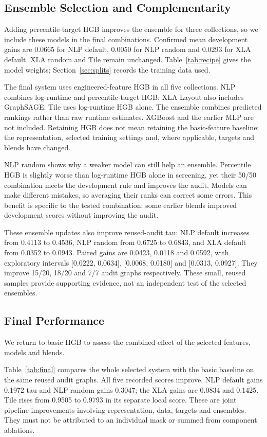 \documentclass[letterpaper]{article}
\begin{document}
\subsection{Ensemble Selection and Complementarity}
\label{sec:ensembles}
Adding percentile-target HGB improves the ensemble for three collections, so we include these models in the final combinations. Confirmed mean development gains are 0.0665 for NLP default, 0.0050 for NLP random and 0.0293 for XLA default. XLA random and Tile remain unchanged. Table~\ref{tab:recipe} gives the model weights; Section~\ref{sec:splits} records the training data used.


The final system uses engineered-feature HGB in all five collections. NLP combines log-runtime and percentile-target HGB; XLA Layout also includes GraphSAGE; Tile uses log-runtime HGB alone. The ensemble combines predicted rankings rather than raw runtime estimates. XGBoost and the earlier MLP are not included. Retaining HGB does not mean retaining the basic-feature baseline: the representation, selected training settings and, where applicable, targets and blends have changed.

NLP random shows why a weaker model can still help an ensemble. Percentile HGB is slightly worse than log-runtime HGB alone in screening, yet their 50/50 combination meets the development rule and improves the audit. Models can make different mistakes, so averaging their ranks can correct some errors. This benefit is specific to the tested combination: some earlier blends improved development scores without improving the audit.

These ensemble updates also improve reused-audit tau: NLP default increases from 0.4113 to 0.4536, NLP random from 0.6725 to 0.6843, and XLA default from 0.0352 to 0.0943. Paired gains are 0.0423, 0.0118 and 0.0592, with exploratory intervals [0.0222, 0.0634], [0.0068, 0.0180] and [0.0313, 0.0927]. They improve 15/20, 18/20 and 7/7 audit graphs respectively. These small, reused samples provide supporting evidence, not an independent test of the selected ensembles.

\subsection{Final Performance}
We return to basic HGB to assess the combined effect of the selected features, models and blends.

Table~\ref{tab:final} compares the whole selected system with the basic baseline on the same reused audit graphs. All five recorded scores improve. NLP default gains 0.1972 tau and NLP random gains 0.3047; the XLA gains are 0.0834 and 0.1425. Tile rises from 0.9505 to 0.9793 in its separate local score. These are joint pipeline improvements involving representation, data, targets and ensembles. They must not be attributed to an individual mask or summed from component ablations.
\end{document}

